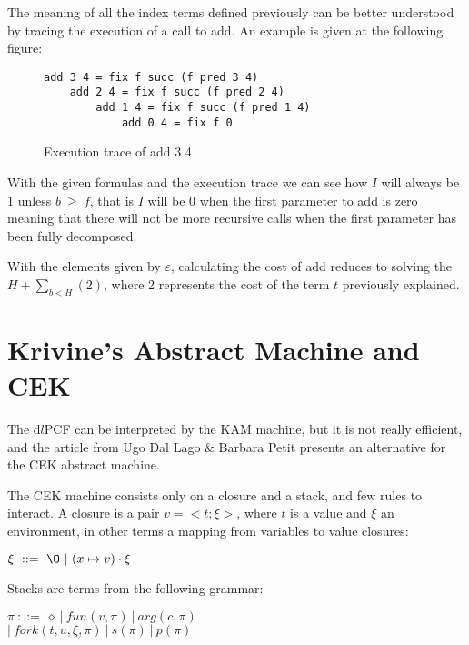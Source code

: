 \documentclass[a4paper,12pt]{article}
\begin{document}
The meaning of all the index terms defined previously can be better
understood by tracing the execution of a call to add. An example is
given at the following figure: 


\begin{figure}[ht]
\begin{center}
\begin{verbatim}
add 3 4 = fix f succ (f pred 3 4)
    add 2 4 = fix f succ (f pred 2 4)
        add 1 4 = fix f succ (f pred 1 4)
            add 0 4 = fix f 0 
\end{verbatim}
\end{center}
\label{exectrace}
\caption{Execution trace of add 3 4}
\end{figure}

With the given formulas and the execution trace we can see how $I$ will always
be 1 unless $b~\geq~f$, that is $I$ will be 0 when the first parameter to add is
zero meaning that there will not be more recursive calls when the first
parameter has been fully decomposed. 

With the elements given by $\varepsilon$, calculating the cost of add
reduces to solving the $H + \sum\limits_{b<H} (2) $, where 2
represents the cost of the term $t$ previously explained.



\section{Krivine's Abstract Machine and CEK}

The d$l$PCF can be interpreted by the KAM machine, but it is not really
efficient, and the article from Ugo Dal Lago \& Barbara Petit \cite{ldtcbv}
presents an alternative for the CEK abstract machine.

The CEK machine consists only on a closure and a stack, and few rules to
interact. A closure is a pair $v =<t;\xi>$, where $t$ is a value and $\xi$
an environment, in other terms a mapping from variables to value closures:

\begin{center}
  $\xi ~ ::=~\O~|~(x \mapsto v) \cdot \xi$
\end{center}

Stacks are terms from the following grammar:

\begin{center}
  $\pi~::=~\diamond~|~fun(v, \pi)~|~arg(c, \pi)$ \\
  $|~fork(t,u,\xi,\pi)~|~s(\pi)~|~p(\pi)$
\end{center}
\end{document}
